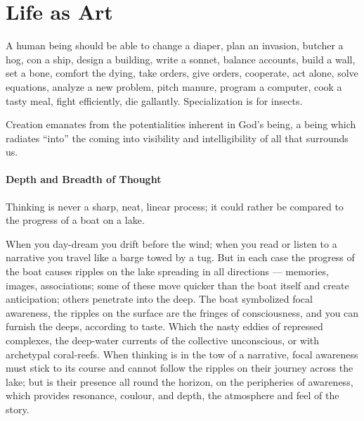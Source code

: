 \section{Life as Art}

\begin{quotex}
A human being should be able to change a diaper, plan an invasion, butcher a hog, con a ship, design a building, write a sonnet, balance accounts, build a wall, set a bone, comfort the dying, take orders, give orders, cooperate, act alone, solve equations, analyze a new problem, pitch manure, program a computer, cook a tasty meal, fight efficiently, die gallantly. Specialization is for insects.
\end{quotex}


\begin{quotex}
Creation emanates from the potentialities inherent in God's being, a being which radiates ``into'' the coming into visibility and intelligibility of all that surrounds us.
\end{quotex}


\paragraph{Depth and Breadth of Thought}


\begin{quotationx}
Thinking is never a sharp, neat, linear process; it could rather be compared to the progress of a boat on a lake.

When you day-dream you drift before the wind; when you read or listen to a narrative you travel like a barge towed by a tug. But in each case the progress of the boat causes ripples on the lake spreading in all directions --- memories, images, associations; some of these move quicker than the boat itself and create anticipation; others penetrate into the deep. The boat symbolized focal awareness, the ripples on the surface are the fringes of consciousness, and you can furnish the deeps, according to taste. Which the nasty eddies of repressed complexes, the deep-water currents of the collective unconscious, or with archetypal coral-reefs. When thinking is in the tow of a narrative, focal awareness must stick to its course and cannot follow the ripples on their journey across the lake; but is their presence all round the horizon, on the peripheries of awareness, which provides resonance, coulour, and depth, the atmosphere and feel of the story.
\end{quotationx}


